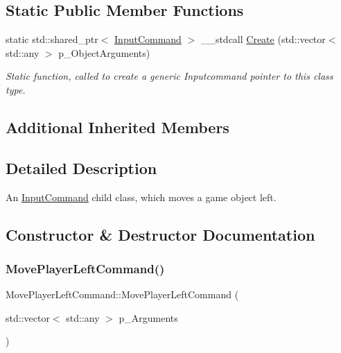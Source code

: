\subsection*{Static Public Member Functions}
\begin{DoxyCompactItemize}
\item 
static std\+::shared\+\_\+ptr$<$ \mbox{\hyperlink{class_input_command}{Input\+Command}} $>$ \+\_\+\+\_\+stdcall \mbox{\hyperlink{class_move_player_left_command_af905db38ba4b857598b050cbd8bf2667}{Create}} (std\+::vector$<$ std\+::any $>$ p\+\_\+\+Object\+Arguments)
\begin{DoxyCompactList}\small\item\em Static function, called to create a generic Inputcommand pointer to this class type. \end{DoxyCompactList}\end{DoxyCompactItemize}
\subsection*{Additional Inherited Members}


\subsection{Detailed Description}
An \mbox{\hyperlink{class_input_command}{Input\+Command}} child class, which moves a game object left. 

\subsection{Constructor \& Destructor Documentation}
\mbox{\label{class_move_player_left_command_abe4089d4fb0c385f39b7b96a52178c59}} 
\subsubsection{\texorpdfstring{MovePlayerLeftCommand()}{MovePlayerLeftCommand()}}
{\footnotesize\ttfamily Move\+Player\+Left\+Command\+::\+Move\+Player\+Left\+Command (\begin{DoxyParamCaption}\item[{std\+::vector$<$ std\+::any $>$}]{p\+\_\+\+Arguments }\end{DoxyParamCaption})\hspace{0.3cm}{\ttfamily [inline]}}



